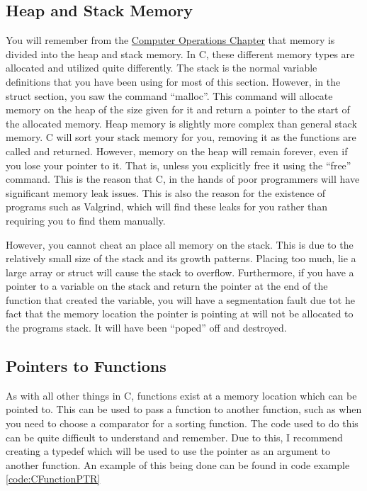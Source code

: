 			\begin{code}
				C}]{./CStructs.c}
				\caption{Example of a C Struct}
				\label{code:CStructs}
			\end{code}
		\subsection{Heap and Stack Memory}
			You will remember from the \hyperref[ch:ComputerOperations]{Computer Operations Chapter} that memory is divided into the heap and stack memory. 
			In C, these different memory types are allocated and utilized quite differently. 
			The stack is the normal variable definitions that you have been using for most of this section. 
			However, in the struct section, you saw the command ``malloc''. 
			This command will allocate memory on the heap of the size given for it and return a pointer to the start of the allocated memory. 
			Heap memory is slightly more complex than general stack memory. 
			C will sort your stack memory for you, removing it as the functions are called and returned. 
			However, memory on the heap will remain forever, even if you lose your pointer to it. 
			That is, unless you explicitly free it using the ``free'' command. 
			This is the reason that C, in the hands of poor programmers will have significant memory leak issues. 
			This is also the reason for the existence of programs such as Valgrind, which will find these leaks for you rather than requiring you to find them manually. 
			
			However, you cannot cheat an place all memory on the stack. 
			This is due to the relatively small size of the stack and its growth patterns. 
			Placing too much, lie a large array or struct will cause the stack to overflow. 
			Furthermore, if you have a pointer to a variable on the stack and return the pointer at the end of the function that created the variable, 
			you will have a segmentation fault due tot he fact that the memory location the pointer is pointing at will not be allocated to the programs stack. 
			It will have been ``poped'' off and destroyed. 

		\subsection{Pointers to Functions}
			As with all other things in C, functions exist at a memory location which can be pointed to. 
			This can be used to pass a function to another function, such as when you need to choose a comparator for a sorting function. 
			The code used to do this can be quite difficult to understand and remember. 
			Due to this, I recommend creating a typedef which will be used to use the pointer as an argument to another function. 
			An example of this being done can be found in code example \ref{code:CFunctionPTR}	
			\begin{code}
				C}]{./CFunctionPTR.c}
				\caption{Example of a C Function Pointers}
				\label{code:CFunctionPTR}
			\end{code}
